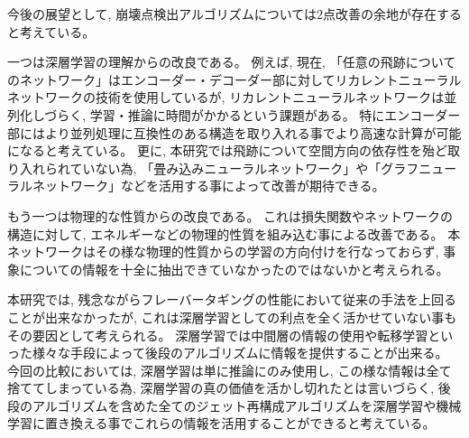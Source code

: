 今後の展望として, 崩壊点検出アルゴリズムについては$2$点改善の余地が存在すると考えている。

一つは深層学習の理解からの改良である。
例えば, 現在, 「任意の飛跡についてのネットワーク」はエンコーダー・デコーダー部に対してリカレントニューラルネットワークの技術を使用しているが, リカレントニューラルネットワークは並列化しづらく, 学習・推論に時間がかかるという課題がある。
特にエンコーダー部にはより並列処理に互換性のある構造を取り入れる事でより高速な計算が可能になると考えている。
更に, 本研究では飛跡について空間方向の依存性を殆ど取り入れられていない為, 「畳み込みニューラルネットワーク」や「グラフニューラルネットワーク」などを活用する事によって改善が期待できる。

もう一つは物理的な性質からの改良である。
これは損失関数やネットワークの構造に対して, エネルギーなどの物理的性質を組み込む事による改善である。
本ネットワークはその様な物理的性質からの学習の方向付けを行なっておらず, 事象についての情報を十全に抽出できていなかったのではないかと考えられる。

本研究では, 残念ながらフレーバータギングの性能において従来の手法を上回ることが出来なかったが, これは深層学習としての利点を全く活かせていない事もその要因として考えられる。
深層学習では中間層の情報の使用や転移学習といった様々な手段によって後段のアルゴリズムに情報を提供することが出来る。
今回の比較においては, 深層学習は単に推論にのみ使用し, この様な情報は全て捨ててしまっている為, 深層学習の真の価値を活かし切れたとは言いづらく, 後段のアルゴリズムを含めた全てのジェット再構成アルゴリズムを深層学習や機械学習に置き換える事でこれらの情報を活用することができると考えている。

















